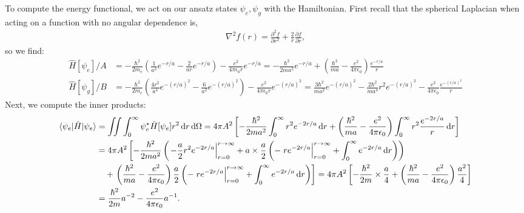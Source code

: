\documentclass[10pt]{article}
\newcommand{\1}{\mathbf 1}
\begin{document}
To compute the energy functional, we act on our ansatz states $\psi_e, \psi_g$ with the Hamiltonian.
First recall that the spherical Laplacian when acting on a function with no angular dependence is,
\begin{align}
	\nabla^2 f(r)
	=
	\frac{\partial^2 f}{\partial r^2}
	+
	\frac{2}{r} \frac{\partial f}{\partial r},
\end{align}
so we find:
\begin{align}
	\hat H [\psi_e]/A
	&=
	-\frac{\hbar^2}{2m_e}
	\left(
	\frac{1}{a^2}e^{-r/a}
	-
	\frac{2}{ar}
	e^{-r/a}
	\right)
	-
	\frac{e^2}{4 \pi \epsilon_0 r}
	e^{-r/a}
	=
	-\frac{\hbar^2}{2ma^2}
	e^{-r/a}
	+
	\left(
		\frac{\hbar^2}{ma}
		-
		\frac{e^2}{4\pi \epsilon_0}
	\right)
	\frac{e^{-r/a}}{r}
	\\
	\hat H[\psi_g]/B
	&
	=
	-
	\frac{\hbar^2}{2m_e}\left(
		\frac{4r^2}{a^4}
		e^{-(r/a)^2}
		-
		\frac{6}{a^2}
		e^{-(r/a)^2}
	\right)
	-
	\frac{e^2}{4\pi\epsilon_0r}
	e^{-(r/a)^2}
	=
	\frac{3\hbar^2}{ma^2}
	e^{-(r/a)^2}
	-
	\frac{2\hbar^2}{m a^4}
	r^2e^{-(r/a)^2}
	-
	\frac{e^2}{4\pi \epsilon_0}
	\frac{e^{-(r/a)^2}}{r}
\end{align}
Next, we compute the inner products:
\begin{align}
	\braket{\psi_e | \hat H |\psi_e}
	&=\nonumber
	\iint 
	\int_0^\infty 
	\psi_e^* \hat H[\psi_e]
	r^2
	\,\mathrm{d}r
	\,\mathrm{d}\Omega 
	=
	4\pi A^2
	\left[
	-\frac{\hbar^2}{2ma^2}
	\int_0^\infty r^2   e^{-2r/a} \,\mathrm{d}r
	+
	\left(
		\frac{\hbar^2}{ma}
		-
		\frac{e^2}{4\pi \epsilon_0}
	\right)
	\int_0^\infty r^2 
	\frac{e^{-2r/a}}{r}
	\,\mathrm{d}r
	\right]
	\\
	&=\nonumber
	4\pi A^2
	\left[
	-\frac{\hbar^2}{2ma^2}
	\left(
		\left.
		-\frac{a}{2}
		r^2 e^{-2r/a}
		\right|_{r = 0}^{r \to \infty}
		+
		a\times\frac{a}{2}
		\left(
			-
			\left.r e^{-2r/a}\right|_{r=0}^{r \to \infty}
			+
			\int_{0}^\infty e^{-2r/a} \,\mathrm{d}r
		\right)
	\right)\right.\\
	&\nonumber\quad
	+
	\left.
	\left(
		\frac{\hbar^2}{ma}
		-
		\frac{e^2}{4\pi \epsilon_0}
	\right)
	\frac{a}{2}
	\left(
		- \left.r e^{-2r/a}\right|_{r=0}^{r \to \infty}
		+
		\int_0^\infty e^{-2r/a} \,\mathrm{d}r
	\right)
	\right]
	=
	4 \pi A^2
	\left[
		-\frac{\hbar^2}{2m} \times \frac{a}{4}
		+
		\left(
			\frac{\hbar^2}{ma}
			-
			\frac{e^2}{4 \pi \epsilon_0}
		\right)
		\frac{a^2}{4}
	\right]
	\\
	&=\label{eEF}
	\frac{\hbar^2}{2 m}
	a^{-2}
	-
	\frac{e^2}{4 \pi \epsilon_0}
	a^{-1}.
\end{align}
\end{document}
